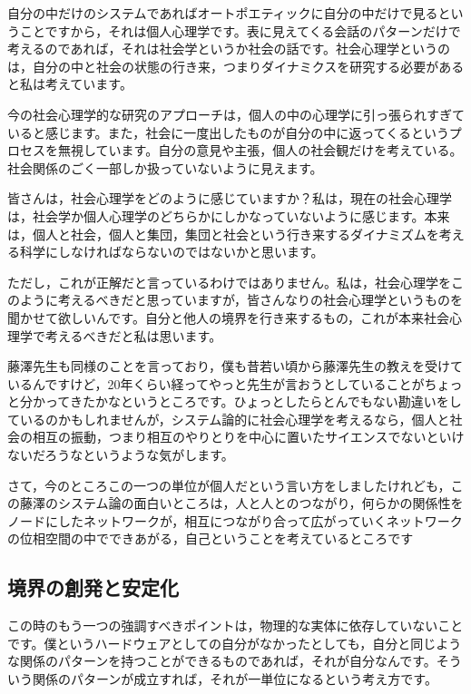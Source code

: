 \documentclass{ltjsbook}
\begin{document}
自分の中だけのシステムであればオートポエティックに自分の中だけで見るということですから，それは個人心理学です。表に見えてくる会話のパターンだけで考えるのであれば，それは社会学というか社会の話です。社会心理学というのは，自分の中と社会の状態の行き来，つまりダイナミクスを研究する必要があると私は考えています。

今の社会心理学的な研究のアプローチは，個人の中の心理学に引っ張られすぎていると感じます。また，社会に一度出したものが自分の中に返ってくるというプロセスを無視しています。自分の意見や主張，個人の社会観だけを考えている。社会関係のごく一部しか扱っていないように見えます。

皆さんは，社会心理学をどのように感じていますか？私は，現在の社会心理学は，社会学か個人心理学のどちらかにしかなっていないように感じます。本来は，個人と社会，個人と集団，集団と社会という行き来するダイナミズムを考える科学にしなければならないのではないかと思います。

ただし，これが正解だと言っているわけではありません。私は，社会心理学をこのように考えるべきだと思っていますが，皆さんなりの社会心理学というものを聞かせて欲しいんです。自分と他人の境界を行き来するもの，これが本来社会心理学で考えるべきだと私は思います。

藤澤先生も同様のことを言っており，僕も昔若い頃から藤澤先生の教えを受けているんですけど，20年くらい経ってやっと先生が言おうとしていることがちょっと分かってきたかなというところです。ひょっとしたらとんでもない勘違いをしているのかもしれませんが，システム論的に社会心理学を考えるなら，個人と社会の相互の振動，つまり相互のやりとりを中心に置いたサイエンスでないといけないだろうなというような気がします。

さて，今のところこの一つの単位が個人だという言い方をしましたけれども，この藤澤のシステム論の面白いところは，人と人とのつながり，何らかの関係性をノードにしたネットワークが，相互につながり合って広がっていくネットワークの位相空間の中でできあがる，自己ということを考えているところです

\subsection{境界の創発と安定化}

この時のもう一つの強調すべきポイントは，物理的な実体に依存していないことです。僕というハードウェアとしての自分がなかったとしても，自分と同じような関係のパターンを持つことができるものであれば，それが自分なんです。そういう関係のパターンが成立すれば，それが一単位になるという考え方です。
\end{document}
